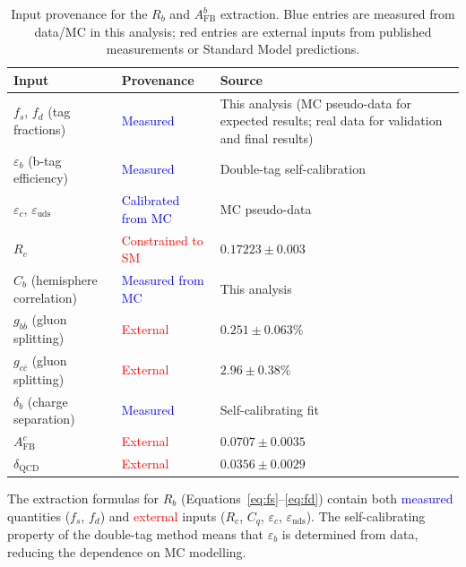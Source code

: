 \documentclass[11pt,a4paper]{article}
\newcommand{\measured}[1]{\textcolor{blue}{#1}}
\newcommand{\external}[1]{\textcolor{red}{#1}}
\begin{document}
\begin{table}[htbp]
\centering
\caption{Input provenance for the $R_b$ and $A_\mathrm{FB}^b$ extraction.
Blue entries are measured from data/MC in this analysis; red entries are
external inputs from published measurements or Standard Model predictions.}
\label{tab:input_provenance}
\small
\begin{tabular}{lll}
\toprule
Input & Provenance & Source \\
\midrule
$f_s$, $f_d$ (tag fractions) & \measured{Measured} & This analysis (MC pseudo-data for expected results; real data for validation and final results) \\
$\varepsilon_b$ (b-tag efficiency) & \measured{Measured} & Double-tag self-calibration \\
$\varepsilon_c$, $\varepsilon_\mathrm{uds}$ & \measured{Calibrated from MC} & MC pseudo-data \\
$R_c$ & \external{Constrained to SM} & $0.17223 \pm 0.003$~\cite{LEP:EWWG:2005} \\
$C_b$ (hemisphere correlation) & \measured{Measured from MC} & This analysis \\
$g_{b\bar{b}}$ (gluon splitting) & \external{External} & $0.251 \pm 0.063\%$~\cite{LEP:HF:2001} \\
$g_{c\bar{c}}$ (gluon splitting) & \external{External} & $2.96 \pm 0.38\%$~\cite{LEP:gcc} \\
$\delta_b$ (charge separation) & \measured{Measured} & Self-calibrating fit \\
$A_\mathrm{FB}^c$ & \external{External} & $0.0707 \pm 0.0035$~\cite{LEP:EWWG:2005} \\
$\delta_\mathrm{QCD}$ & \external{External} & $0.0356 \pm 0.0029$~\cite{LEP:EWWG:2005} \\
\bottomrule
\end{tabular}
\end{table}

The extraction formulas for $R_b$ (Equations~\ref{eq:fs}--\ref{eq:fd}) contain both
\measured{measured} quantities ($f_s$, $f_d$) and \external{external} inputs
($R_c$, $C_q$, $\varepsilon_c$, $\varepsilon_\mathrm{uds}$). The self-calibrating
property of the double-tag method means that $\varepsilon_b$ is determined from data,
reducing the dependence on MC modelling.

\FloatBarrier
{}
\end{document}
